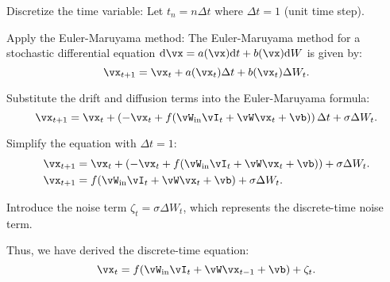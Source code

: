 \documentclass[letterpaper]{article}
\newcommand{\dm}[1]{\ensuremath{\mathrm{d}{#1}}} %
\newcommand{\win}{\vW_{\text{in}}}
\begin{document}
Discretize the time variable: Let \( t_n = n \Delta t \) where \( \Delta t = 1 \) (unit time step).

Apply the Euler-Maruyama method: The Euler-Maruyama method for a stochastic differential equation \( \dm{\vx} = a(\vx)\dm{t} + b(\vx)\dm{W} \) is given by: \[ \vx_{t+1} = \vx_t + a(\vx_t) \Delta t + b(\vx_t) \Delta W_t. \]

Substitute the drift and diffusion terms into the Euler-Maruyama formula: \[ \vx_{t+1} = \vx_t + \left( -\vx_t + f(\win \vI_t + \vW \vx_t + \vb) \right) \Delta t + \sigma \Delta W_t. \]

Simplify the equation with \(\Delta t = 1\): 
\begin{align}
 \vx_{t+1} &= \vx_t + \left( -\vx_t + f(\win \vI_t + \vW \vx_t + \vb) \right) + \sigma \Delta W_t. \\
 \vx_{t+1} &= f(\win \vI_t + \vW \vx_t + \vb) + \sigma \Delta W_t. 
 \end{align}

Introduce the noise term \(\zeta_t = \sigma \Delta W_t\), which represents the discrete-time noise term.

Thus, we have derived the discrete-time equation: \[ \vx_t = f(\win \vI_t + \vW \vx_{t-1} + \vb) + \zeta_t. \]
\end{document}
